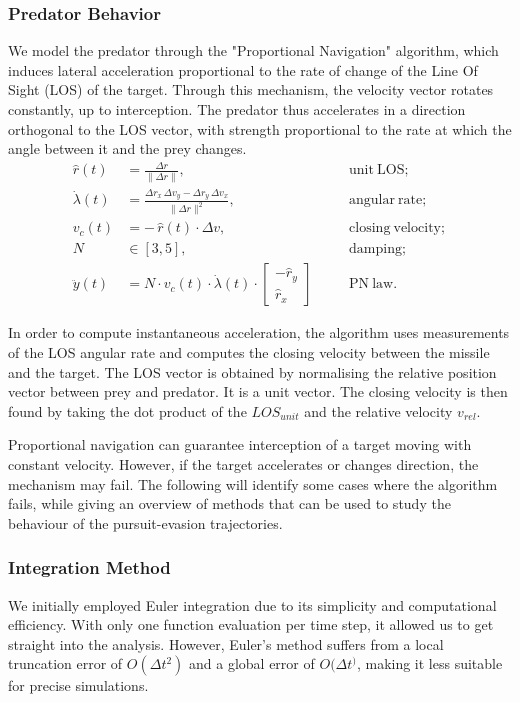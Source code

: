 \documentclass[10pt, twocolumn]{article}
\begin{document}
    \subsubsection{Predator Behavior}
    We model the predator through the "Proportional Navigation" algorithm, which induces lateral acceleration proportional to the rate of change of the Line Of Sight (LOS) of the target. Through this mechanism, the velocity vector rotates constantly, up to interception. The predator thus accelerates in a direction orthogonal to the LOS vector, with strength proportional to the rate at which the angle between it and the prey changes.
    \[
      \begin{aligned}
        \hat r(t) &= \frac{\Delta r}{\|\Delta r\|},
        &\quad &\mathrm{unit\ LOS};\\
        \dot\lambda(t) &= \frac{\Delta r_x\,\Delta v_y - \Delta r_y\,\Delta v_x}{\|\Delta r\|^2},
        &\quad &\mathrm{angular\ rate};\\
        v_c(t) &= -\,\hat r(t)\cdot\Delta v,
        &\quad &\mathrm{closing\ velocity};\\
        N &\in [3,5],
        &\quad &\mathrm{damping};\\
        \ddot{y}(t) &= N \cdot v_c(t) \cdot \dot{\lambda}(t) \cdot
        \begin{bmatrix} -\hat{r}_y \\ \hat{r}_x
        \end{bmatrix}
        &\quad &\mathrm{PN\ law}.
      \end{aligned}
    \]

    In order to compute instantaneous acceleration, the algorithm uses measurements of the LOS angular rate and computes the closing velocity between the missile and the target. The LOS vector is obtained by normalising the relative position vector between prey and predator. It is a unit vector. The closing velocity is then found by taking the dot product of the $\textit{LOS}_{unit}$ and the relative velocity $\textit{v}_{rel}$.

    Proportional navigation can guarantee interception of a target moving with constant velocity. However, if the target accelerates or changes direction, the mechanism may fail. The following will identify some cases where the algorithm fails, while giving an overview of methods that can be used to study the behaviour of the pursuit-evasion trajectories.

    \subsubsection{Integration Method}
    We initially employed Euler integration due to its simplicity and computational efficiency. With only one function evaluation per time step, it allowed us to get straight into the analysis. However, Euler's method suffers from a local truncation error of $O(\Delta t^2)$ and a global error of $O(\Delta t^)$, making it less suitable for precise simulations.
\end{document}
